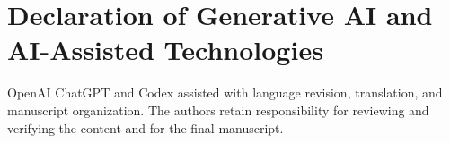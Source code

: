 \section*{Declaration of Generative AI and AI-Assisted Technologies}

OpenAI ChatGPT and Codex assisted with language revision, translation, and manuscript organization.
The authors retain responsibility for reviewing and verifying the content and for the final manuscript.
